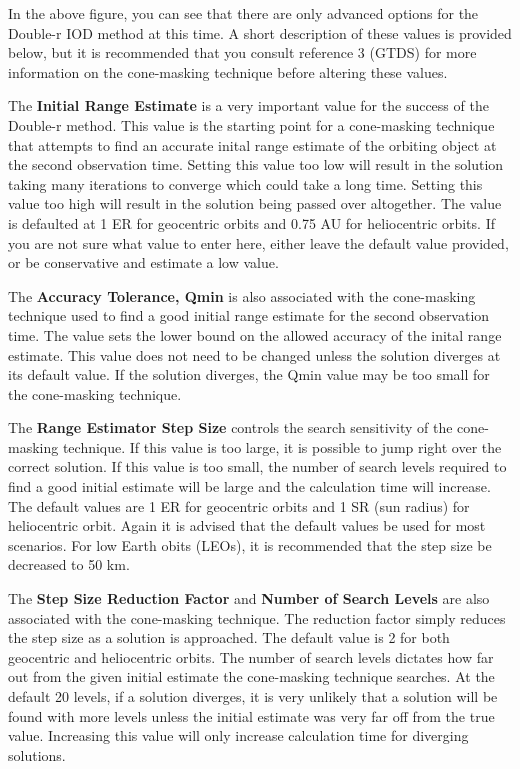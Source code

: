 \documentclass{article}
\begin{document}
			    	In the above figure, you can see that there are only advanced options for the Double-r IOD method at this time. A short description of these values is provided below, but it is recommended that you consult reference 3 (GTDS) for more information on 
				the cone-masking technique before altering these values. \par
				
				The \textbf{Initial Range Estimate} is a very important value 	
				for the success of the Double-r method. This value is the starting point for a cone-masking technique that attempts to find an accurate inital range estimate of the 
				orbiting object at the second observation time. Setting this value too low will result in the solution taking many iterations to converge which could take a long time.
				Setting this value too high will result in the solution being passed over altogether. The value is defaulted at 1 ER for geocentric orbits and 0.75  AU for heliocentric
				orbits. If you are not sure what value to enter here, either leave the default value provided, or be conservative and estimate a low value.\par

				The \textbf{Accuracy Tolerance, Qmin} is also associated with the cone-masking technique used to find a good initial range estimate for the second observation time.
				The value sets the lower bound on the allowed accuracy of the inital range estimate. This value does not need to be changed unless the solution diverges at its default value.
				If the solution diverges, the Qmin value may be too small for the cone-masking technique.\par

				The \textbf{Range Estimator Step Size} controls the search sensitivity of the cone-masking technique. If this value is too large, it is possible to jump right over the correct solution.
				If this value is too small, the number of search levels required to find a good initial estimate will be large and the calculation time will increase. The default values are 1 ER for 		   
				geocentric orbits and 1 SR (sun radius) for heliocentric orbit. Again it is advised that the default values be used for most scenarios. For low Earth obits (LEOs), it is recommended that the step size be decreased to 50 km.\par

				The \textbf{Step Size Reduction Factor} and \textbf{Number of Search Levels} are also associated with the cone-masking technique. The reduction factor simply reduces the step size as a solution is approached. The default
				value is 2 for both geocentric and heliocentric orbits. The number of search levels dictates how far out from the given initial estimate the cone-masking technique searches. At the default 20 levels, if a solution diverges,
				it is very unlikely that a solution will be found with more levels unless the initial estimate was very far off from the true value. Increasing this value will only increase calculation time for diverging solutions. \par
\end{document}
